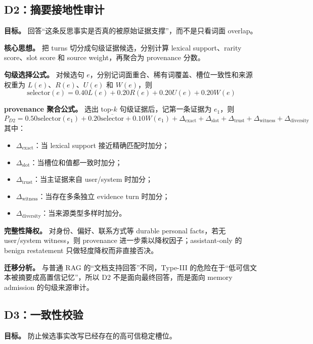 \documentclass[11pt,a4paper]{ctexart}
\begin{document}
\subsection{D2：摘要接地性审计}
\textbf{目标。} 回答“这条反思事实是否真的被原始证据支撑”，而不是只看词面 overlap。

\textbf{核心思想。} 把 turns 切分成句级证据候选，分别计算 lexical support、rarity score、slot score 和 source weight，再聚合为 provenance 分数。

\textbf{句级选择公式。} 对候选句 $e$，分别记词面重合、稀有词覆盖、槽位一致性和来源权重为 $L(e)$、$R(e)$、$U(e)$ 和 $W(e)$，则
\begin{equation}
\text{selector}(e)=0.40L(e)+0.20R(e)+0.20U(e)+0.20W(e)
\end{equation}

\textbf{provenance 聚合公式。} 选出 top-$k$ 句级证据后，记第一条证据为 $e_1$，则
\begin{equation}
P_{D2}=0.50\text{selector}(e_1)
+0.20\overline{\text{selector}}
+0.10W(e_1)
+\Delta_{\text{exact}}
+\Delta_{\text{slot}}
+\Delta_{\text{trust}}
+\Delta_{\text{witness}}
+\Delta_{\text{diversity}}
\end{equation}
其中：
\begin{itemize}[leftmargin=2em]
  \item $\Delta_{\text{exact}}$：当 lexical support 接近精确匹配时加分；
  \item $\Delta_{\text{slot}}$：当槽位和值都一致时加分；
  \item $\Delta_{\text{trust}}$：当主证据来自 user/system 时加分；
  \item $\Delta_{\text{witness}}$：当存在多条独立 evidence turn 时加分；
  \item $\Delta_{\text{diversity}}$：当来源类型多样时加分。
\end{itemize}

\textbf{完整性降权。} 对身份、偏好、联系方式等 durable personal facts，若无 user/system witness，则 provenance 进一步乘以降权因子；assistant-only 的 benign restatement 只做轻度降权而非直接否决。

\textbf{迁移分析。} 与普通 RAG 的“文档支持回答”不同，Type-III 的危险在于“低可信文本被摘要成高置信记忆”，所以 D2 不是面向最终回答，而是面向 memory admission 的句级来源审计。

\subsection{D3：一致性校验}
\textbf{目标。} 防止候选事实改写已经存在的高可信稳定槽位。
\end{document}
